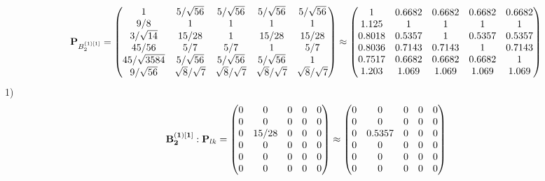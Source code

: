\documentclass[10pt,a4paper]{article}
\begin{document}
	\[
		\bold{P}_{B_2^{(1)[1]}} = 
		\begin{pmatrix}
			{1}{} & {{5}} / {\sqrt{56}} & {{5}} / {\sqrt{56}} & {{5}} / {\sqrt{56}} & {{5}} / {\sqrt{56}} \\
			{{9}} / {{8}} & {1}{} & {1}{} & {1}{} & {1}{} \\
			{{3}} / {\sqrt{14}} & {{15}} / {{28}} & {1}{} & {{15}} / {{28}} & {{15}} / {{28}} \\
			{{45}} / {{56}} & {{5}} / {{7}} & {{5}} / {{7}} & {1}{} & {{5}} / {{7}} \\
			{{45}} / {\sqrt{3584}} & {{5}} / {\sqrt{56}} & {{5}} / {\sqrt{56}} & {{5}} / {\sqrt{56}} & {1}{} \\
			{{9}} / {\sqrt{56}} & {\sqrt{8}} / {\sqrt{7}} & {\sqrt{8}} / {\sqrt{7}} & {\sqrt{8}} / {\sqrt{7}} & {\sqrt{8}} / {\sqrt{7}} \\
		\end{pmatrix}
		\approx
		\begin{pmatrix}
			1        & 0.6682   & 0.6682   & 0.6682   & 0.6682   \\
			1.125    & 1        & 1        & 1        & 1        \\
			0.8018   & 0.5357   & 1        & 0.5357   & 0.5357   \\
			0.8036   & 0.7143   & 0.7143   & 1        & 0.7143   \\
			0.7517   & 0.6682   & 0.6682   & 0.6682   & 1        \\
			1.203    & 1.069    & 1.069    & 1.069    & 1.069    \\
		\end{pmatrix}
	\]
	1)
	\[
		\bold{B_2^{(1)[1]}}: \bold{P}_{lk} = 
		\begin{pmatrix}
			{{0}}{} & {{0}}{} & {{0}}{} & {{0}}{} & {{0}}{} \\
			{{0}}{} & {{0}}{} & {{0}}{} & {{0}}{} & {{0}}{} \\
			{{0}}{} & {{15}} / {{28}} & {{0}}{} & {{0}}{} & {{0}}{} \\
			{{0}}{} & {{0}}{} & {{0}}{} & {{0}}{} & {{0}}{} \\
			{{0}}{} & {{0}}{} & {{0}}{} & {{0}}{} & {{0}}{} \\
			{{0}}{} & {{0}}{} & {{0}}{} & {{0}}{} & {{0}}{} \\
		\end{pmatrix}
		\approx
		\begin{pmatrix}
			0        & 0        & 0        & 0        & 0        \\
			0        & 0        & 0        & 0        & 0        \\
			0        & 0.5357   & 0        & 0        & 0        \\
			0        & 0        & 0        & 0        & 0        \\
			0        & 0        & 0        & 0        & 0        \\
			0        & 0        & 0        & 0        & 0        \\
		\end{pmatrix}
	\]
\end{document}
